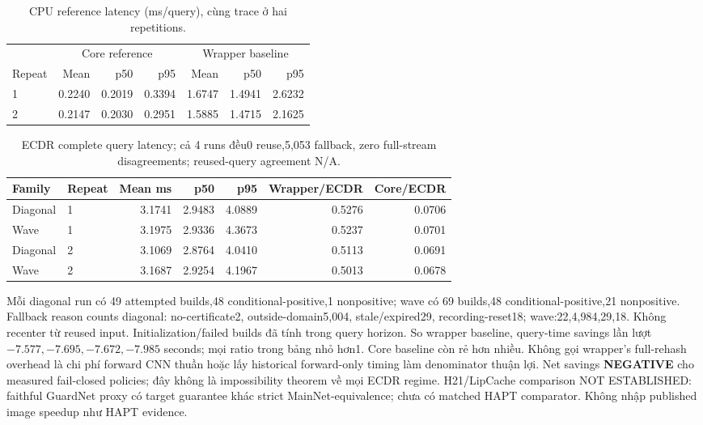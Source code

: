 \documentclass[11pt,a4paper]{article}
\theoremstyle{remark}
\begin{document}
\begin{table}[!htbp]\centering\small
\caption{CPU reference latency (ms/query), cùng trace ở hai repetitions.}
\begin{tabular}{@{}lrrrrrr@{}}\toprule
 & \multicolumn{3}{c}{Core reference} & \multicolumn{3}{c}{Wrapper baseline}\\
Repeat & Mean & p50 & p95 & Mean & p50 & p95\\\midrule
1 & 0.2240 & 0.2019 & 0.3394 & 1.6747 & 1.4941 & 2.6232\\
2 & 0.2147 & 0.2030 & 0.2951 & 1.5885 & 1.4715 & 2.1625\\
\bottomrule\end{tabular}\end{table}
\begin{table}[!htbp]\centering\small
\caption{ECDR complete query latency; cả 4 runs đều0 reuse,5,053 fallback,
zero full-stream disagreements; reused-query agreement N/A.}
\begin{tabular}{@{}llrrrrr@{}}\toprule
Family & Repeat & Mean ms & p50 & p95 & Wrapper/ECDR & Core/ECDR\\\midrule
Diagonal & 1 & 3.1741 & 2.9483 & 4.0889 & 0.5276 & 0.0706\\
Wave & 1 & 3.1975 & 2.9336 & 4.3673 & 0.5237 & 0.0701\\
Diagonal & 2 & 3.1069 & 2.8764 & 4.0410 & 0.5113 & 0.0691\\
Wave & 2 & 3.1687 & 2.9254 & 4.1967 & 0.5013 & 0.0678\\
\bottomrule\end{tabular}\end{table}
Mỗi diagonal run có 49 attempted builds,48 conditional-positive,1 nonpositive;
wave có 69 builds,48 conditional-positive,21 nonpositive. Fallback reason
counts diagonal: no-certificate2, outside-domain5,004, stale/expired29,
recording-reset18; wave:22,4,984,29,18. Không recenter từ reused input.
Initialization/failed builds đã tính trong query horizon. So wrapper baseline,
query-time savings lần lượt$-7.577,-7.695,-7.672,-7.985$ seconds; mọi ratio
trong bảng nhỏ hơn1. Core baseline còn rẻ hơn nhiều. Không gọi wrapper's
full-rehash overhead là chi phí forward CNN thuần hoặc lấy historical
forward-only timing làm denominator thuận lợi. Net savings \textbf{NEGATIVE}
cho measured fail-closed policies; đây không là impossibility theorem về
mọi ECDR regime. H21/LipCache comparison NOT ESTABLISHED: faithful GuardNet
proxy có target guarantee khác strict MainNet-equivalence; chưa có matched
HAPT comparator. Không nhập published image speedup như HAPT evidence.
\end{document}
